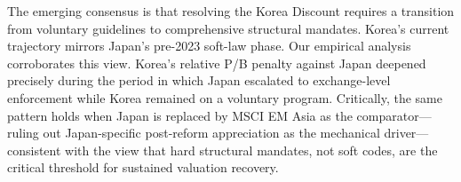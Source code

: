 The emerging consensus is that resolving the Korea Discount requires a transition from voluntary guidelines to comprehensive structural mandates. Korea's current trajectory mirrors Japan's pre-2023 soft-law phase. Our empirical analysis corroborates this view. Korea's relative P/B penalty against Japan deepened precisely during the period in which Japan escalated to exchange-level enforcement while Korea remained on a voluntary program. Critically, the same pattern holds when Japan is replaced by MSCI EM Asia as the comparator---ruling out Japan-specific post-reform appreciation as the mechanical driver---consistent with the view that hard structural mandates, not soft codes, are the critical threshold for sustained valuation recovery.
